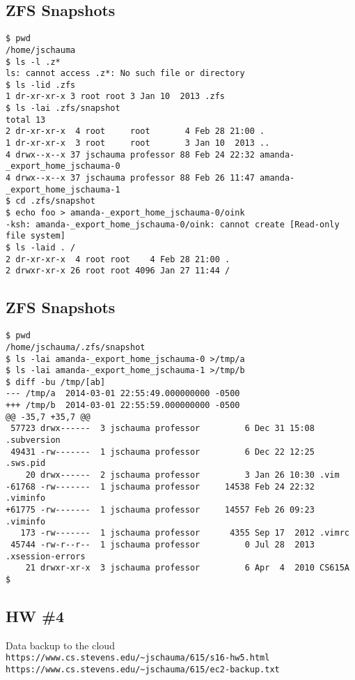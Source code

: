 \documentclass[xga]{xdvislides}
\begin{document}
\subsection{ZFS Snapshots}
\smallish
\begin{verbatim}
$ pwd
/home/jschauma
$ ls -l .z*
ls: cannot access .z*: No such file or directory
$ ls -lid .zfs
1 dr-xr-xr-x 3 root root 3 Jan 10  2013 .zfs
$ ls -lai .zfs/snapshot
total 13
2 dr-xr-xr-x  4 root     root       4 Feb 28 21:00 .
1 dr-xr-xr-x  3 root     root       3 Jan 10  2013 ..
4 drwx--x--x 37 jschauma professor 88 Feb 24 22:32 amanda-_export_home_jschauma-0
4 drwx--x--x 37 jschauma professor 88 Feb 26 11:47 amanda-_export_home_jschauma-1
$ cd .zfs/snapshot
$ echo foo > amanda-_export_home_jschauma-0/oink
-ksh: amanda-_export_home_jschauma-0/oink: cannot create [Read-only file system]
$ ls -laid . /
2 dr-xr-xr-x  4 root root    4 Feb 28 21:00 .
2 drwxr-xr-x 26 root root 4096 Jan 27 11:44 /
\end{verbatim}
\Normalsize

\subsection{ZFS Snapshots}
\smallish
\begin{verbatim}
$ pwd
/home/jschauma/.zfs/snapshot
$ ls -lai amanda-_export_home_jschauma-0 >/tmp/a
$ ls -lai amanda-_export_home_jschauma-1 >/tmp/b
$ diff -bu /tmp/[ab]
--- /tmp/a	2014-03-01 22:55:49.000000000 -0500
+++ /tmp/b	2014-03-01 22:55:59.000000000 -0500
@@ -35,7 +35,7 @@
 57723 drwx------  3 jschauma professor         6 Dec 31 15:08 .subversion
 49431 -rw-------  1 jschauma professor         6 Dec 22 12:25 .sws.pid
    20 drwx------  2 jschauma professor         3 Jan 26 10:30 .vim
-61768 -rw-------  1 jschauma professor     14538 Feb 24 22:32 .viminfo
+61775 -rw-------  1 jschauma professor     14557 Feb 26 09:23 .viminfo
   173 -rw-------  1 jschauma professor      4355 Sep 17  2012 .vimrc
 45744 -rw-r--r--  1 jschauma professor         0 Jul 28  2013 .xsession-errors
    21 drwxr-xr-x  3 jschauma professor         6 Apr  4  2010 CS615A
$
\end{verbatim}
\Normalsize

\subsection{HW \#4}
Data backup to the cloud \\
\verb+https://www.cs.stevens.edu/~jschauma/615/s16-hw5.html+
\\
\verb+https://www.cs.stevens.edu/~jschauma/615/ec2-backup.txt+
\end{document}
